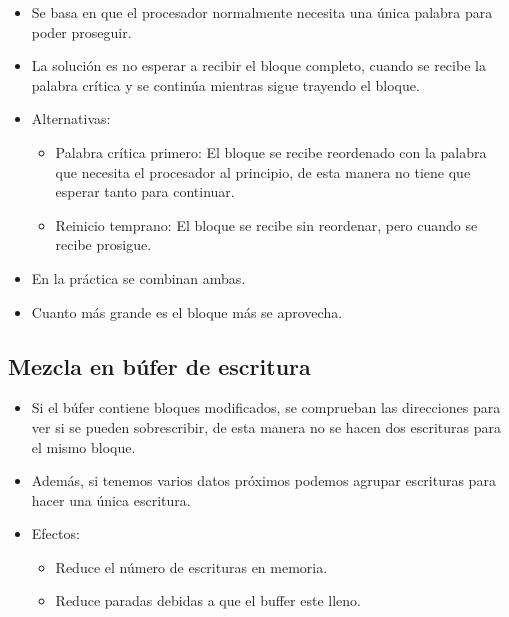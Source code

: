\documentclass[12pt, twoside, openright]{report} %
\begin{document}
    \begin{itemize}
    
    \item
      Se basa en que el procesador normalmente necesita una única
      palabra para poder proseguir.
    \item
      La solución es no esperar a recibir el bloque completo, cuando se
      recibe la palabra crítica y se continúa mientras sigue trayendo el
      bloque.
    \item
      Alternativas:

      \begin{itemize}
      
      \item
        Palabra crítica primero: El bloque se recibe reordenado con la
        palabra que necesita el procesador al principio, de esta manera
        no tiene que esperar tanto para continuar.
      \item
        Reinicio temprano: El bloque se recibe sin reordenar, pero
        cuando se recibe prosigue.
      \end{itemize}
    \item
      En la práctica se combinan ambas.
    \item
      Cuanto más grande es el bloque más se aprovecha.
    \end{itemize}
  \subsection{Mezcla en búfer de escritura}

    \begin{itemize}
    
    \item
      Si el búfer contiene bloques modificados, se comprueban las
      direcciones para ver si se pueden sobrescribir, de esta manera no
      se hacen dos escrituras para el mismo bloque.
    \item
      Además, si tenemos varios datos próximos podemos agrupar
      escrituras para hacer una única escritura.
    \item
      Efectos:

      \begin{itemize}
      
      \item
        Reduce el número de escrituras en memoria.
      \item
        Reduce paradas debidas a que el buffer este lleno.
      \end{itemize}
    \end{itemize}
\end{document}
